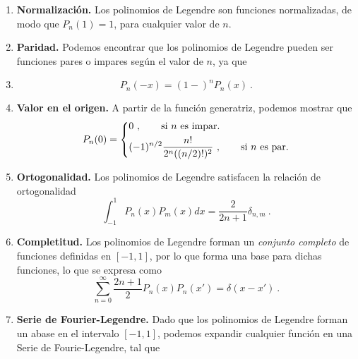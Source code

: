 \begin{enumerate}
    \item \textbf{Normalización.} Los polinomios de Legendre son funciones normalizadas, de modo que $P_n(1) = 1$, para cualquier valor de $n$.
    \item \textbf{Paridad.} Podemos encontrar que los polinomios de Legendre pueden ser funciones pares o impares según el valor de $n$, ya que
    \item \begin{equation}
        P_n(-x) = (1-)^n P_n(x) \ . 
    \end{equation}

    \item \textbf{Valor en el origen.} A partir de la función generatriz, podemos mostrar que
    \begin{equation}
        P_n(0) = \begin{dcases}
            0 \ , \qquad \text{si } n \text{ es impar.} \\
            (-1)^{n/2} \frac{n!}{2^n ((n/2)!)^2} \ , \qquad \text{si } n \text{ es par.}
        \end{dcases}
    \end{equation}

    \item \textbf{Ortogonalidad.} Los polinomios de Legendre satisfacen la relación de ortogonalidad
    \begin{equation}
        \int_{-1}^1 P_n(x) P_m(x) dx = \frac{2}{2n+1} \delta_{n,m} \ .
    \end{equation}

    \item \textbf{Completitud.} Los polinomios de Legendre forman un \emph{conjunto completo} de funciones definidas en $[-1,1]$, por lo que forma una base para dichas funciones, lo que se expresa como
    \begin{equation}
        \sum_{n=0}^\infty \frac{2n+1}{2} P_n(x) P_n(x') = \delta(x-x') \ .
    \end{equation}

    \item \textbf{Serie de Fourier-Legendre.} Dado que los polinomios de Legendre forman un abase en el intervalo $[-1,1]$, podemos expandir cualquier función en una Serie de Fourie-Legendre, tal que


\end{enumerate}
